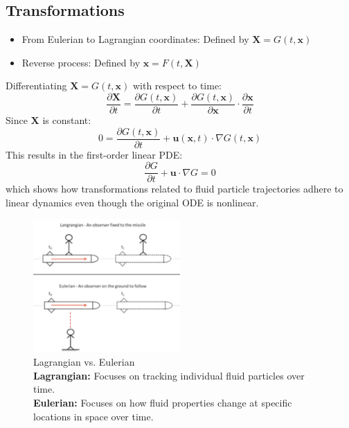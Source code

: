 \documentclass{article}
\begin{document}
\subsection{Transformations}
\begin{itemize}
    \item From Eulerian to Lagrangian coordinates: Defined by $\mathbf{X} = G(t, \mathbf{x})$
    \item Reverse process: Defined by $\mathbf{x} = F(t, \mathbf{X})$
\end{itemize}
Differentiating $\mathbf{X} = G(t, \mathbf{x})$ with respect to time:
\begin{equation}
\frac{\partial \mathbf{X}}{\partial t} = \frac{\partial G(t,\mathbf{x})}{\partial t} + \frac{\partial G(t,\mathbf{x})}{\partial \mathbf{x}} \cdot \frac{\partial \mathbf{x}}{\partial t}
\end{equation}
Since $\mathbf{X}$ is constant:
\begin{equation}
0 = \frac{\partial G(t,\mathbf{x})}{\partial t} + \mathbf{u}(\mathbf{x},t) \cdot \nabla G(t, \mathbf{x})
\end{equation}
This results in the first-order linear PDE:
\begin{equation}
\frac{\partial G}{\partial t} + \mathbf{u} \cdot \nabla G = 0
\end{equation}
which shows how transformations related to fluid particle trajectories adhere to linear dynamics even though the original ODE is nonlinear.

\begin{figure}[H]
    \centering
    \includegraphics[width=0.5\textwidth]{./src/figures/lagrangian_vs_eulerian.PNG} 
    \caption{
        Lagrangian vs. Eulerian\\
        \textbf{Lagrangian:} Focuses on tracking individual fluid particles over time.\\
        \textbf{Eulerian:} Focuses on how fluid properties change at specific locations in space over time.
    }
    \label{fig:lagrangian_vs_eulerian}
\end{figure}
\end{document}
